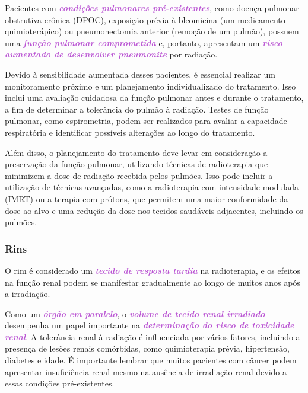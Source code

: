 \documentclass[11pt,a4paper]{article}
\begin{document}
	Pacientes com \textcolor{MediumOrchid}{\textbf{\textit{condições pulmonares pré-existentes}}}, como doença pulmonar obstrutiva crônica (DPOC), exposição prévia à bleomicina (um medicamento quimioterápico) ou pneumonectomia anterior (remoção de um pulmão), possuem uma \textcolor{MediumOrchid}{\textbf{\textit{função pulmonar comprometida}}} e, portanto, apresentam um \textcolor{MediumOrchid}{\textbf{\textit{risco aumentado de desenvolver pneumonite}}} por radiação.

	Devido à sensibilidade aumentada desses pacientes, é essencial realizar um monitoramento próximo e um planejamento individualizado do tratamento. Isso inclui uma avaliação cuidadosa da função pulmonar antes e durante o tratamento, a fim de determinar a tolerância do pulmão à radiação. Testes de função pulmonar, como espirometria, podem ser realizados para avaliar a capacidade respiratória e identificar possíveis alterações ao longo do tratamento.

	Além disso, o planejamento do tratamento deve levar em consideração a preservação da função pulmonar, utilizando técnicas de radioterapia que minimizem a dose de radiação recebida pelos pulmões. Isso pode incluir a utilização de técnicas avançadas, como a radioterapia com intensidade modulada (IMRT) ou a terapia com prótons, que permitem uma maior conformidade da dose ao alvo e uma redução da dose nos tecidos saudáveis adjacentes, incluindo os pulmões.

\subsubsection*{Rins}

	O rim é considerado um \textcolor{MediumOrchid}{\textbf{\textit{tecido de resposta tardia}}} na radioterapia, e os efeitos na função renal podem se manifestar gradualmente ao longo de muitos anos após a irradiação.

	Como um \textcolor{MediumOrchid}{\textbf{\textit{órgão em paralelo}}}, o \textcolor{MediumOrchid}{\textbf{\textit{volume de tecido renal irradiado}}} desempenha um papel importante na \textcolor{MediumOrchid}{\textbf{\textit{determinação do risco de toxicidade renal}}}. A tolerância renal à radiação é influenciada por vários fatores, incluindo a presença de lesões renais comórbidas, como quimioterapia prévia, hipertensão, diabetes e idade. É importante lembrar que muitos pacientes com câncer podem apresentar insuficiência renal mesmo na ausência de irradiação renal devido a essas condições pré-existentes.
\end{document}
